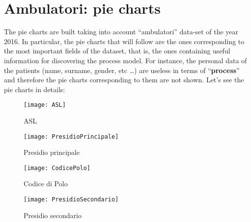 \documentclass[paper=a4, fontsize=11pt]{scrartcl} %
\numberwithin{equation}{section} %
\numberwithin{figure}{section} %
\numberwithin{table}{section} %
\begin{document}
\section{Ambulatori: pie charts}\label{piecharts}
The pie charts are built taking into account ``ambulatori'' data-set of the year 2016. In particular, the pie charts that will follow are the ones corresponding to the most important fields of the dataset, that is, the ones containing useful information for discovering the process model. For instance, the personal data of the patients (name, surname, gender, etc \ldots) are useless in terms of ``\textbf{process}'' and therefore the pie charts corresponding to them are not shown. Let's see the pie charts in details: \newline
\begin{figure} [htbp]
\begin{minipage}[t]{0.5\textwidth}
\centering
\texttt{[image: ASL]}
\caption{ASL}\label{asl}
\end{minipage}
\begin{minipage}[t]{0.5\textwidth}
\centering
\texttt{[image: PresidioPrincipale]}
\caption{Presidio principale}\label{presidioprincipale}
\end{minipage}
\begin{minipage}[t]{0.5\textwidth}
\centering
\texttt{[image: CodicePolo]}
\caption{Codice di Polo}\label{codicepolo}
\end{minipage}
\begin{minipage}[t]{0.5\textwidth}
\centering
\texttt{[image: PresidioSecondario]}
\caption{Presidio secondario}\label{presidiosecondario}
\end{minipage}
\end{figure}
\end{document}
